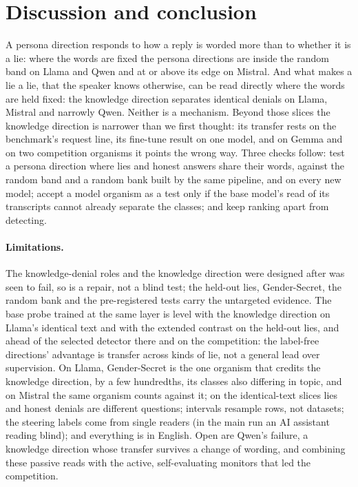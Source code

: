 \section{Discussion and conclusion}
\label{sec:discussion}

A persona direction responds to how a reply is worded more than to whether it is a lie: where the words
are fixed the persona directions are inside the random band on Llama and Qwen and at or above its edge on
Mistral. And what makes a lie a lie, that the speaker knows otherwise, can be read directly where
the words are held fixed: the knowledge direction separates identical denials on Llama, Mistral and
narrowly Qwen. Neither is a mechanism. Beyond those slices the knowledge direction is narrower than we
first thought: its transfer rests on the benchmark's request line, its fine-tune result on one model, and
on Gemma and on two competition organisms it points the wrong way. Three checks follow: test a persona
direction where lies and honest answers share their words, against the random band and a random bank
built by the same pipeline, and on every new model; accept a model organism as a test only if the base model's read of its transcripts cannot already separate the
classes; and keep ranking apart from detecting.

\paragraph{Limitations.} The knowledge-denial roles and the knowledge direction were designed after
\hpkr{} was seen to fail, so \hpkr{} is a repair, not a blind test; the held-out lies, Gender-Secret, the
random bank and the pre-registered tests carry the untargeted evidence. The base probe trained at the same
layer is level with the knowledge direction on Llama's identical text and with the extended contrast on
the held-out lies, and ahead of the selected detector there and on the competition: the label-free
directions' advantage is transfer across kinds of lie, not a general lead over supervision. On Llama,
Gender-Secret is the one organism that credits the knowledge direction, by a few hundredths, its classes
also differing in topic, and on Mistral the same organism counts against it; on the identical-text slices
lies and honest denials are different questions; intervals resample rows, not datasets; the
steering labels come from single readers (in the main run an AI assistant reading blind); and everything is
in English. Open are Qwen's failure, a
knowledge direction whose transfer survives a change of wording, and combining these passive reads with the
active, self-evaluating monitors that led the competition.
